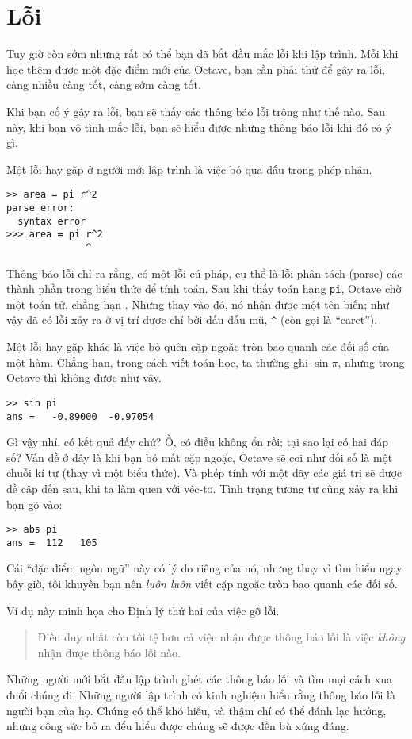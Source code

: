 \documentclass[12pt]{book}
\begin{document}
\section{Lỗi}

Tuy giờ còn sớm nhưng rất có thể bạn đã bắt đầu mắc lỗi khi lập trình.
Mỗi khi học thêm được một đặc điểm mới của Octave, bạn cần phải
thử để gây ra lỗi, càng nhiều càng tốt, càng sớm càng tốt.

Khi bạn cố ý gây ra lỗi, bạn sẽ thấy các thông báo lỗi trông như thế nào.
Sau này, khi bạn vô tình mắc lỗi, bạn sẽ hiểu được những thông báo lỗi
khi đó có ý gì.

Một lỗi hay gặp ở người mới lập trình là việc bỏ qua dấu {\tt *} trong
phép nhân.

\begin{verbatim}
>> area = pi r^2
parse error:
  syntax error
>>> area = pi r^2
              ^
\end{verbatim}
%
Thông báo lỗi chỉ ra rằng, có một lỗi cú pháp, cụ thể là lỗi phân tách (parse)
các thành phần trong biểu thức để tính toán. Sau khi thấy toán hạng {\tt pi},
Octave chờ một toán tử, chẳng hạn {\tt *}.  Nhưng thay vào đó,
nó nhận được một tên biến; như vậy đã có lỗi xảy ra ở vị trí được chỉ bởi dấu 
dấu mũ, \verb#^# (còn gọi là ``caret'').

Một lỗi hay gặp khác là việc bỏ quên cặp ngoặc tròn bao quanh các
đối số của một hàm. Chẳng hạn, trong cách viết toán học, ta thường 
ghi $\sin \pi$, nhưng trong Octave thì không được như vậy.

\begin{verbatim}
>> sin pi
ans =   -0.89000  -0.97054
\end{verbatim}
%
Gì vậy nhỉ, có kết quả đấy chứ? Ồ, có điều không ổn rồi; tại sao lại có
hai đáp số? Vấn đề ở đây là khi bạn bỏ mất cặp ngoặc, Octave sẽ coi như 
đối số là một chuỗi kí tự (thay vì một biểu thức). Và phép tính với một dãy
các giá trị sẽ được đề cập đến sau, khi ta làm quen với véc-tơ. Tình trạng 
tương tự cũng xảy ra khi bạn gõ vào:

\begin{verbatim}
>> abs pi
ans =  112   105
\end{verbatim}
%
Cái ``đặc điểm ngôn ngữ'' này có lý do riêng của nó, nhưng thay vì tìm
hiểu ngay bây giờ, tôi khuyên bạn nên {\em luôn luôn} viết cặp ngoặc
tròn bao quanh các đối số.

Ví dụ này minh họa cho Định lý thứ hai của việc gỡ lỗi.

\begin{quote}
Điều duy nhất còn tồi tệ hơn cả việc nhận được thông báo lỗi là việc 
{\em không} nhận được thông báo lỗi nào.
\end{quote}
%
Những người mới bắt đầu lập trình ghét các thông báo lỗi và tìm mọi cách
xua đuổi chúng đi. Những người lập trình có kinh nghiệm hiểu rằng thông
báo lỗi là người bạn của họ. Chúng có thể khó hiểu, và thậm chí có thể
đánh lạc hướng, nhưng công sức bỏ ra đểu hiểu được chúng sẽ được
đền bù xứng đáng.
\end{document}
